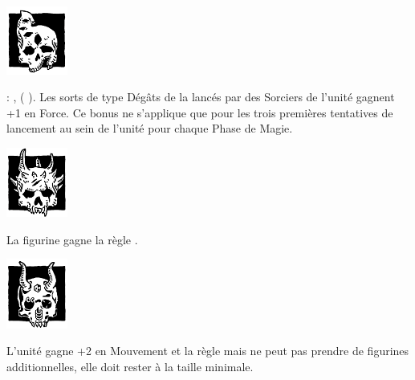 \begin{multicols}{2}

\begin{center}\includegraphics[width=2cm]{pics/change.png}

\noindent\textbf{\chosenofchange}
\end{center}

\wizardconclave{} : \changesignature{}, \changespellone{} (\Pathof{} \change{}). Les sorts de type Dégâts de la \Pathof{} \change{} lancés par des Sorciers de l'unité gagnent +1 en Force. Ce bonus ne s'applique que pour les trois premières tentatives de lancement au sein de l'unité pour chaque Phase de Magie.

\vspace*{0.2cm}\vspace*{\fill}

\begin{center}\includegraphics[width=2cm]{pics/wrath.png}

\noindent\textbf{\chosenofwrath}
\end{center}

La figurine gagne la règle \frenzy{}.

\columnbreak

\begin{center}\includegraphics[width=2cm]{pics/lust.png}

\noindent\textbf{\chosenoflust}
\end{center}

L'unité gagne +2 en Mouvement et la règle \skirmisher{} mais ne peut pas prendre de figurines additionnelles, elle doit rester à la taille minimale.

\vspace*{0.2cm}\vspace*{\fill}


\end{multicols}
